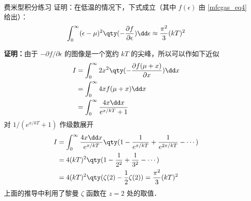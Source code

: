 \begin{lemma}{费米型积分练习}\label{mfcgas_lem1}
证明：在低温的情况下，下式成立（其中 $f(\epsilon)$ 由 \autoref{mfcgas_eq4} 给出）：
\begin{equation}
\int_0^\infty (\epsilon-\mu)^2 \qty(-\frac{\partial f}{\partial \epsilon})\dd\epsilon
\approx\frac{\pi^2}{3}(kT)^2
\end{equation}


\textbf{证明：}由于 $-\partial f/\partial \epsilon$ 的图像是一个宽约 $k T$ 的尖峰，所以可以作如下近似
\begin{equation}
\begin{aligned}
I&=\int_0^\infty 2x^2 \qty(-\frac{\partial f(\mu+x)}{\partial x}) \dd x\\
&=\int_0^\infty 4x f(\mu+x) \dd x\\
&=\int_0^\infty \frac{4x\dd x}{e^{x/kT}+1}
\end{aligned}
\end{equation}
对 $1/(e^{x/kT}+1)$ 作级数展开
\begin{equation}
\begin{aligned}
I&=\int_0^\infty \frac{4x\dd x}{e^{x/kT}}\qty(1-\frac{1}{e^{x/kT}}+\frac{1}{e^{2x/kT}}-\cdots)\\
&=4(kT)^2 \qty(1-\frac{1}{2^2}+\frac{1}{3^2}-\cdots)\\
&=4(kT)^2 \qty(\zeta(2)-\frac{1}{2}\zeta(2))=\frac{\pi^2}{3}(kT)^2
\end{aligned}
\end{equation}
上面的推导中利用了黎曼 $\zeta$ 函数在 $z=2$ 处的取值．
\end{lemma}